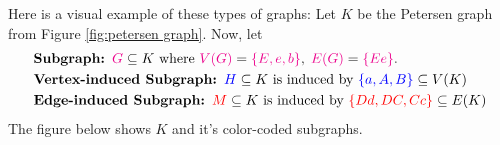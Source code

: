 Here is a visual example of these types of graphs: Let $K$ be the Petersen graph from Figure \ref{fig:petersen graph}. Now, let
\begin{align*}
    &\textbf{Subgraph: } \textcolor{magenta}{G} \subseteq K \text{ where }\textcolor{magenta}{V(G)} = \textcolor{magenta}{\{E, e, b\}},\; \textcolor{magenta}{E(G)} = \textcolor{magenta}{\{Ee\}}.\\
    &\textbf{Vertex-induced Subgraph: } \textcolor{blue}{H} \subseteq K \text{ is induced by } \textcolor{blue}{\{a, A, B\}}\subseteq V(K)\\
    &\textbf{Edge-induced Subgraph: } \textcolor{red}{M} \subseteq K 
    \text{ is induced by }\textcolor{red}{\{Dd, DC, Cc\}}\subseteq E(K)
\end{align*}
The figure below shows $K$ and it's color-coded subgraphs.


